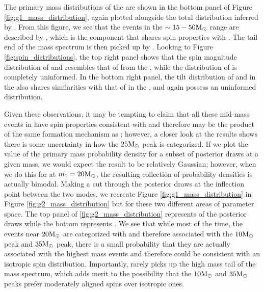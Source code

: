 The primary mass distributions of the \comp{} are shown in the bottom panel of Figure \ref{fig:g1_mass_distribution}, again plotted alongside the total distribution inferred by \brucepaper{}. From this figure, we see that the events in the $\sim15-50 {\rm M}_\odot$ range are described by \contA{}, which is the component that shares spin properties with \first{}. The tail end of the mass spectrum is then picked up by \contB{}. Looking to Figure \ref{fig:spin_distributions}, the top right panel shows that the spin magnitude distribution of \first{} and \contA{} resembles that of \first{} from the \base{}, while the distribution of \contB{} is completely uninformed. In the bottom right panel, the tilt distribution of \first{} and \contA{} in the \comp{} also shares similarities with that of \first{} in the \base{}, and again \contB{} possess an uninformed distribution. 

Given these observations, it may be tempting to claim that all these mid-mass events in \contA{} have spin properties consistent with \first{} and therefore may be the product of the same formation mechanism as \first{}; however, a closer look at the results shows there is some uncertainty in how the $25 {\rm M}_\odot$ peak is categorized. If we plot the value of the primary mass probability density for a subset of posterior draws at a given mass, we would expect the result to be relatively Gaussian; however, when we do this for \contB{} at $m_1 = 20 {\rm M}_\odot$, the resulting collection of probability densities is actually bimodal. Making a cut through the posterior draws at the inflection point between the two modes, we recreate Figure \ref{fig:g1_mass_distribution} in Figure \ref{fig:g2_mass_distribution} but for these two different areas of parameter space. The top panel of \ref{fig:g2_mass_distribution} represents  of the posterior draws while the bottom represents . We see that while most of the time, the events near $20{\rm M}_\odot$ are categorized with \contA{} and therefore associated with the $10{\rm M}_\odot$ peak and $35{\rm M}_\odot$ peak, there is a small probability that they are actually associated with the highest mass events and therefore could be consistent with an isotropic spin distribution. Importantly, \contA{} rarely picks up the high mass tail of the mass spectrum, which adds merit to the possibility that the $10{\rm M}_\odot$ and $35{\rm M}_\odot$ peaks prefer moderately aligned spins over isotropic ones. 

